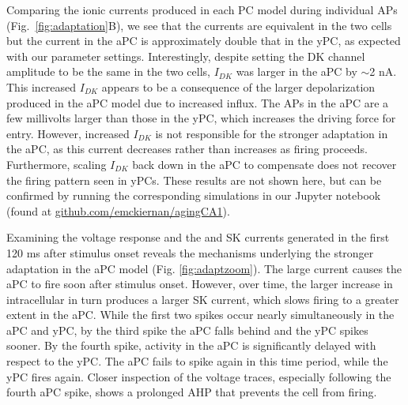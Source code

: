 \documentclass[12pt]{article}
\begin{document}
Comparing the ionic currents produced in each PC model during individual APs (Fig.~\ref{fig:adaptation}B), we see that the {\Na} currents are equivalent in the two cells but the {\Ca} current in the aPC is approximately double that in the yPC, as expected with our parameter settings. Interestingly, despite setting the DK channel amplitude to be the same in the two cells, $I_{DK}$ was larger in the aPC by $\sim$2 nA. This increased $I_{DK}$ appears to be a consequence of the larger depolarization produced in the aPC model due to increased {\Ca} influx. The APs in the aPC are a few millivolts larger than those in the yPC, which increases the driving force for {\K} entry. However, increased $I_{DK}$ is not responsible for the stronger adaptation in the aPC, as this current decreases rather than increases as firing proceeds. Furthermore, scaling $I_{DK}$ back down in the aPC to compensate does not recover the firing pattern seen in yPCs. These results are not shown here, but can be confirmed by running the corresponding simulations in our Jupyter notebook (found at \href{https://github.com/emckiernan/agingCA1}{github.com/emckiernan/agingCA1}).

Examining the voltage response and the {\Ca} and SK currents generated in the first 120 ms after stimulus onset reveals the mechanisms underlying the stronger adaptation in the aPC model (Fig. \ref{fig:adaptzoom}). The large {\Ca} current causes the aPC to fire soon after stimulus onset. However, over time, the larger increase in intracellular {\Ca} in turn produces a larger SK current, which slows firing to a greater extent in the aPC. While the first two spikes occur nearly simultaneously in the aPC and yPC, by the third spike the aPC falls behind and the yPC spikes sooner. By the fourth spike, activity in the aPC is significantly delayed with respect to the yPC. The aPC fails to spike again in this time period, while the yPC fires again. Closer inspection of the voltage traces, especially following the fourth aPC spike, shows a prolonged AHP that prevents the cell from firing.
\end{document}
